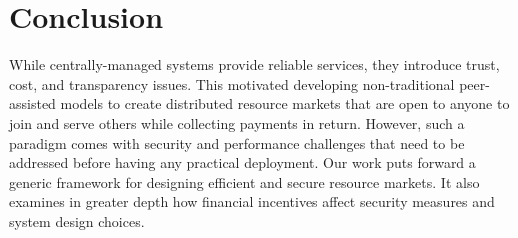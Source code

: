 \documentclass{llncs}
\begin{document}
\section{Conclusion}
While centrally-managed systems provide reliable services, they introduce trust, cost, and transparency issues. This motivated developing non-traditional peer-assisted models to create distributed resource markets that are open to anyone to join and serve others while collecting payments in return. However, such a paradigm comes with security and performance challenges that need to be addressed before having any practical deployment. Our work puts forward a generic framework for designing efficient and secure resource markets. It also examines in greater depth how financial incentives affect security measures and system design choices.


{\footnotesize \vspace{-6pt}

}

\normalsize

\end{document}

